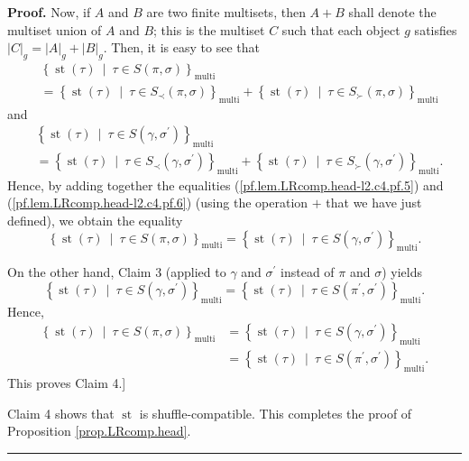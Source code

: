 \documentclass[numbers=enddot,12pt,final,onecolumn,notitlepage]{scrartcl}%
\theoremstyle{definition}
\newenvironment{proof}[1][Proof]{\noindent\textbf{#1.} }{\ \rule{0.5em}{0.5em}}
\begin{document}
\begin{proof}
Now, if $A$ and $B$ are two finite multisets, then $A+B$ shall denote the
multiset union of $A$ and $B$; this is the multiset $C$ such that each object
$g$ satisfies $\left\vert C\right\vert _{g}=\left\vert A\right\vert
_{g}+\left\vert B\right\vert _{g}$. Then, it is easy to see that%
\begin{align*}
&  \left\{  \operatorname*{st}\left(  \tau\right)  \ \mid\ \tau\in S\left(
\pi,\sigma\right)  \right\}  _{\operatorname*{multi}}\\
&  =\left\{  \operatorname*{st}\left(  \tau\right)  \ \mid\ \tau\in S_{\prec
}\left(  \pi,\sigma\right)  \right\}  _{\operatorname*{multi}}+\left\{
\operatorname*{st}\left(  \tau\right)  \ \mid\ \tau\in S_{\succ}\left(
\pi,\sigma\right)  \right\}  _{\operatorname*{multi}}%
\end{align*}
and
\begin{align*}
&  \left\{  \operatorname*{st}\left(  \tau\right)  \ \mid\ \tau\in S\left(
\gamma,\sigma^{\prime}\right)  \right\}  _{\operatorname*{multi}}\\
&  =\left\{  \operatorname*{st}\left(  \tau\right)  \ \mid\ \tau\in S_{\prec
}\left(  \gamma,\sigma^{\prime}\right)  \right\}  _{\operatorname*{multi}%
}+\left\{  \operatorname*{st}\left(  \tau\right)  \ \mid\ \tau\in S_{\succ
}\left(  \gamma,\sigma^{\prime}\right)  \right\}  _{\operatorname*{multi}}.
\end{align*}
Hence, by adding together the equalities (\ref{pf.lem.LRcomp.head-l2.c4.pf.5})
and (\ref{pf.lem.LRcomp.head-l2.c4.pf.6}) (using the operation $+$ that we
have just defined), we obtain the equality%
\[
\left\{  \operatorname*{st}\left(  \tau\right)  \ \mid\ \tau\in S\left(
\pi,\sigma\right)  \right\}  _{\operatorname*{multi}}=\left\{
\operatorname*{st}\left(  \tau\right)  \ \mid\ \tau\in S\left(  \gamma
,\sigma^{\prime}\right)  \right\}  _{\operatorname*{multi}}.
\]


On the other hand, Claim 3 (applied to $\gamma$ and $\sigma^{\prime}$ instead
of $\pi$ and $\sigma$) yields%
\[
\left\{  \operatorname*{st}\left(  \tau\right)  \ \mid\ \tau\in S\left(
\gamma,\sigma^{\prime}\right)  \right\}  _{\operatorname*{multi}}=\left\{
\operatorname*{st}\left(  \tau\right)  \ \mid\ \tau\in S\left(  \pi^{\prime
},\sigma^{\prime}\right)  \right\}  _{\operatorname*{multi}}.
\]
Hence,%
\begin{align*}
\left\{  \operatorname*{st}\left(  \tau\right)  \ \mid\ \tau\in S\left(
\pi,\sigma\right)  \right\}  _{\operatorname*{multi}}  &  =\left\{
\operatorname*{st}\left(  \tau\right)  \ \mid\ \tau\in S\left(  \gamma
,\sigma^{\prime}\right)  \right\}  _{\operatorname*{multi}}\\
&  =\left\{  \operatorname*{st}\left(  \tau\right)  \ \mid\ \tau\in S\left(
\pi^{\prime},\sigma^{\prime}\right)  \right\}  _{\operatorname*{multi}}.
\end{align*}
This proves Claim 4.]

Claim 4 shows that $\operatorname*{st}$ is shuffle-compatible. This completes
the proof of Proposition \ref{prop.LRcomp.head}.
\end{proof}
\end{document}
